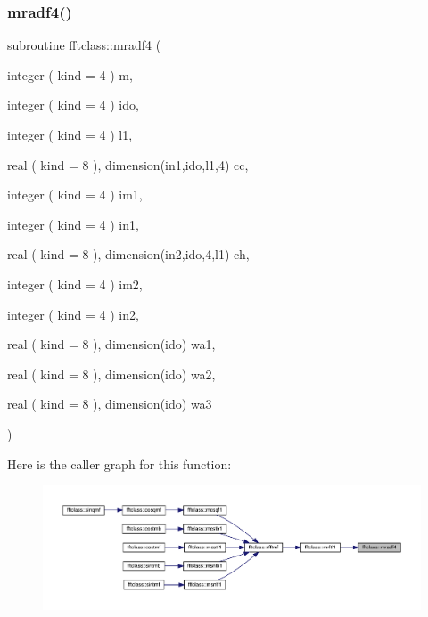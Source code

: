 \subsubsection{\texorpdfstring{mradf4()}{mradf4()}}
{\footnotesize\ttfamily subroutine fftclass\+::mradf4 (\begin{DoxyParamCaption}\item[{integer ( kind = 4 )}]{m,  }\item[{integer ( kind = 4 )}]{ido,  }\item[{integer ( kind = 4 )}]{l1,  }\item[{real ( kind = 8 ), dimension(in1,ido,l1,4)}]{cc,  }\item[{integer ( kind = 4 )}]{im1,  }\item[{integer ( kind = 4 )}]{in1,  }\item[{real ( kind = 8 ), dimension(in2,ido,4,l1)}]{ch,  }\item[{integer ( kind = 4 )}]{im2,  }\item[{integer ( kind = 4 )}]{in2,  }\item[{real ( kind = 8 ), dimension(ido)}]{wa1,  }\item[{real ( kind = 8 ), dimension(ido)}]{wa2,  }\item[{real ( kind = 8 ), dimension(ido)}]{wa3 }\end{DoxyParamCaption})}

Here is the caller graph for this function\+:\nopagebreak
\begin{figure}[H]
\begin{center}
\leavevmode
\includegraphics[width=350pt]{namespacefftclass_aec86b95620b11b4db180468a4f771842_icgraph}
\end{center}
\end{figure}
\mbox{\label{namespacefftclass_ab6d74e30932fcf82744ac339de050933}} 
